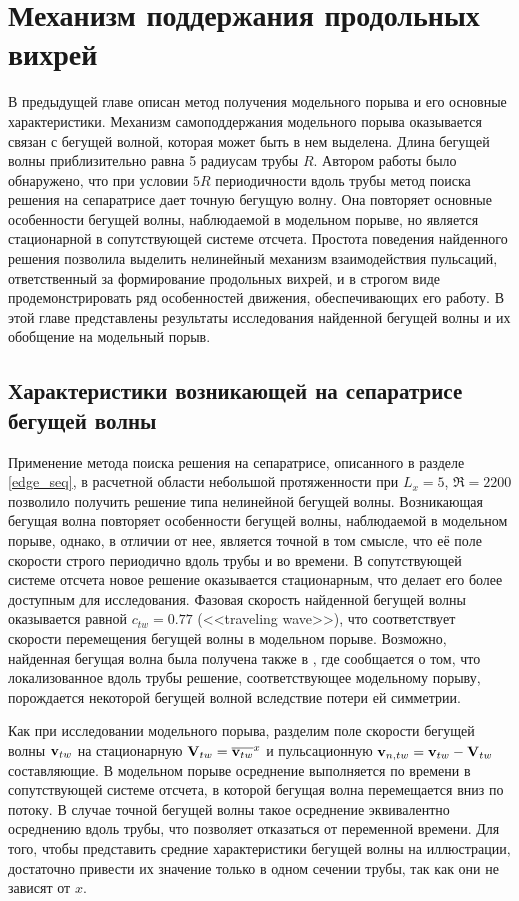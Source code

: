 
\chapter{Механизм поддержания продольных вихрей}


В предыдущей главе описан метод получения модельного порыва и его основные характеристики. Механизм самоподдержания модельного порыва оказывается связан с бегущей волной, которая может быть в нем выделена. Длина бегущей волны приблизительно равна 5 радиусам трубы $R$. Автором работы было обнаружено, что при условии $5R$ периодичности вдоль трубы метод поиска решения на сепаратрисе дает точную бегущую волну. Она повторяет основные особенности бегущей волны, наблюдаемой в модельном порыве, но является стационарной в сопутствующей системе отсчета. Простота поведения найденного решения позволила выделить нелинейный механизм взаимодействия пульсаций, ответственный за формирование продольных вихрей, и в строгом виде продемонстрировать ряд особенностей движения, обеспечивающих его работу. В этой главе представлены результаты исследования найденной бегущей волны и их обобщение на модельный порыв. 



\section{Характеристики возникающей на сепаратрисе бегущей волны}

Применение метода поиска решения на сепаратрисе, описанного в разделе \ref{edge_seq}, в расчетной области небольшой протяженности при $L_x = 5$, $\Re = 2200$ позволило получить решение типа нелинейной бегущей волны. Возникающая бегущая волна повторяет особенности бегущей волны, наблюдаемой в модельном порыве, однако, в отличии от нее, является точной в том смысле, что её поле скорости строго периодично вдоль трубы и во времени. В сопутствующей системе отсчета новое решение оказывается стационарным, что делает его более доступным для исследования. Фазовая скорость найденной бегущей волны оказывается равной $c_{tw} = 0.77$ (<<traveling wave>>), что соответствует скорости перемещения бегущей волны в модельном порыве. Возможно, найденная бегущая волна была получена также в \cite{Chantry2014}, где сообщается о том, что локализованное вдоль трубы решение, соответствующее модельному порыву, порождается некоторой бегущей волной вследствие потери ей симметрии. 

Как при исследовании модельного порыва, разделим поле скорости бегущей волны $\mathbf{v}_{tw}$ на стационарную $\mathbf{V}_{tw} = \overline{\mathbf{v}_{tw}}^{x}$ и пульсационную $\mathbf{v}_{n,tw} = \mathbf{v}_{tw} - \mathbf{V}_{tw}$ составляющие. В модельном порыве осреднение выполняется по времени в сопутствующей системе отсчета, в которой бегущая волна перемещается вниз по потоку. В случае точной бегущей волны такое осреднение эквивалентно осреднению вдоль трубы, что позволяет отказаться от переменной времени. Для того, чтобы представить средние характеристики бегущей волны на иллюстрации, достаточно привести их значение только в одном сечении трубы, так как они не зависят от $x$.

